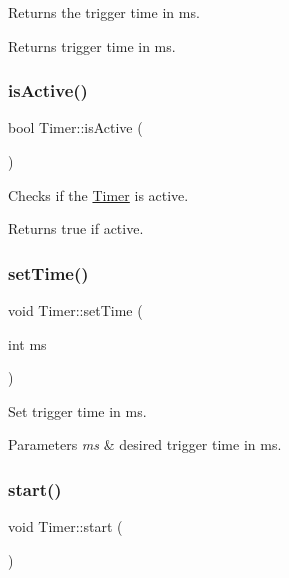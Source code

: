 Returns the trigger time in ms. \begin{DoxyReturn}{Returns}
trigger time in ms. 
\end{DoxyReturn}
\mbox{\label{classdrumpi_1_1clock_1_1Timer_ae675038252bdd55e0d42a92535025ee1}} 
\subsubsection{\texorpdfstring{is\+Active()}{isActive()}}
{\footnotesize\ttfamily bool Timer\+::is\+Active (\begin{DoxyParamCaption}{ }\end{DoxyParamCaption})}

Checks if the \hyperlink{classdrumpi_1_1clock_1_1Timer}{Timer} is active. \begin{DoxyReturn}{Returns}
{\ttfamily true} if active. 
\end{DoxyReturn}
\mbox{\label{classdrumpi_1_1clock_1_1Timer_a0a079d37a70001bfd23754d091db555d}} 
\subsubsection{\texorpdfstring{set\+Time()}{setTime()}}
{\footnotesize\ttfamily void Timer\+::set\+Time (\begin{DoxyParamCaption}\item[{int}]{ms }\end{DoxyParamCaption})}

Set trigger time in ms. 
\begin{DoxyParams}{Parameters}
{\em ms} & desired trigger time in ms. \\
\hline
\end{DoxyParams}
\mbox{\label{classdrumpi_1_1clock_1_1Timer_a3a8b5272198d029779dc9302a54305a8}} 
\subsubsection{\texorpdfstring{start()}{start()}}
{\footnotesize\ttfamily void Timer\+::start (\begin{DoxyParamCaption}{ }\end{DoxyParamCaption})}

